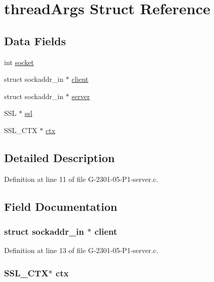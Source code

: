 \hypertarget{structthread_args}{\section{thread\-Args Struct Reference}
\label{structthread_args}
}
\subsection*{Data Fields}
\begin{DoxyCompactItemize}
\item 
int \hyperlink{structthread_args_a3666576f6b88007cc7b8f26c7da596c8}{socket}
\item 
struct sockaddr\-\_\-in $\ast$ \hyperlink{structthread_args_a00c4b9e068a2d36291a8410badf19e85}{client}
\item 
struct sockaddr\-\_\-in $\ast$ \hyperlink{structthread_args_a174501e91471cbe22c45a3a89a932d62}{server}
\item 
S\-S\-L $\ast$ \hyperlink{structthread_args_ae7c0417fa2881f3546920311fee80311}{ssl}
\item 
S\-S\-L\-\_\-\-C\-T\-X $\ast$ \hyperlink{structthread_args_ad5433bcc8a463fb4df3ce5912bb11fe3}{ctx}
\end{DoxyCompactItemize}


\subsection{Detailed Description}


Definition at line 11 of file G-\/2301-\/05-\/\-P1-\/server.\-c.



\subsection{Field Documentation}
\hypertarget{structthread_args_a00c4b9e068a2d36291a8410badf19e85}{
\subsubsection[{client}]{\setlength{\rightskip}{0pt plus 5cm}struct sockaddr\-\_\-in $\ast$ client}}\label{structthread_args_a00c4b9e068a2d36291a8410badf19e85}


Definition at line 13 of file G-\/2301-\/05-\/\-P1-\/server.\-c.

\hypertarget{structthread_args_ad5433bcc8a463fb4df3ce5912bb11fe3}{
\subsubsection[{ctx}]{\setlength{\rightskip}{0pt plus 5cm}S\-S\-L\-\_\-\-C\-T\-X$\ast$ ctx}}\label{structthread_args_ad5433bcc8a463fb4df3ce5912bb11fe3}


